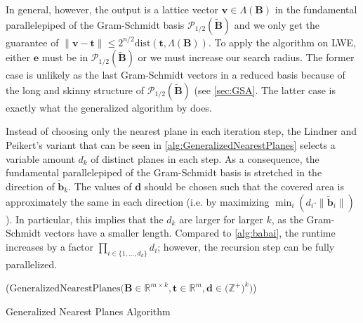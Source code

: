In general, however, the output is a lattice vector $\mathbf{v} \in \Lambda(\mathbf{B})$ in the fundamental parallelepiped of the Gram-Schmidt basis $\mathcal{P}_{1/2}(\tilde{\mathbf{B}})$ and we only get the guarantee of $\|\mathbf{v} - \mathbf{t}\| \leq 2^{n/2} \text{dist}(\mathbf{t}, \Lambda(\mathbf{B}))$. To apply the algorithm on LWE, either $\mathbf{e}$ must be in $\mathcal{P}_{1/2}(\tilde{\mathbf{B}})$ or we must increase our search radius. The former case is unlikely as the last Gram-Schmidt vectors in a reduced basis because of the long and skinny structure of $\mathcal{P}_{1/2}(\tilde{\mathbf{B}})$ (see \cref{sec:GSA}. The latter case is exactly what the generalized algorithm by \cite{LP11} does.

Instead of choosing only the nearest plane in each iteration step, the Lindner and Peikert's variant that can be seen in \cref{alg:GeneralizedNearestPlanes} selects a variable amount $d_k$ of distinct planes in each step. As a consequence, the fundamental parallelepiped of the Gram-Schmidt basis is stretched in the direction of $\tilde{\mathbf{b}}_k$. The values of $\mathbf{d}$ should be chosen such that the covered area is approximately the same in each direction (i.e. by maximizing $\min_i(d_i \cdot \|\tilde{\mathbf{b}}_i\|)$). In particular, this implies that the $d_k$ are larger for larger $k$, as the Gram-Schmidt vectors have a smaller length. %
Compared to \cref{alg:babai}, the runtime increases by a factor $\prod_{i \in \{1, \dots, d_k\}} d_i$; however, the recursion step can be fully parallelized.

\begin{algorithm2e}
  \Begin($\text{GeneralizedNearestPlanes} {(} \mathbf{B} \in \mathbb{R}^{m \times k},\mathbf{t} \in \mathbb{R}^{m}, \mathbf{d} \in {(}\mathbb{Z}^+{)}^k {)}$)
    { %
  }
  \caption[Generalized Nearest Planes Algorithm]{Generalized Nearest Planes Algorithm \cite{LP11}}\label{alg:GeneralizedNearestPlanes}
\end{algorithm2e}

